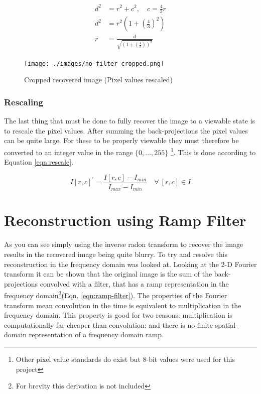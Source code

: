 \documentclass[12pt, a4paper]{article}
\begin{document}
	\begin{align}
		d^2 &= r^2 + c^2, \quad c = \frac{4}{3}r \\
		d^2 &= r^2(1 + (\frac{4}{3})^2) \\
		r &= \frac{d}{\sqrt{(1 + (\frac{4}{3}))^2}} 
		\label{eqn:cropping}
	\end{align}
	
	\begin{figure}
		\centering
		\texttt{[image: ./images/no-filter-cropped.png]}
		\caption{Cropped recovered image (Pixel values rescaled)}
		\label{fig:no-filter-cropped}
	\end{figure}
	
	\subsubsection*{Rescaling}
	The last thing that must be done to fully recover the image to a viewable state is to rescale the pixel values. After summing the back-projections the pixel values can be quite large. For these to be properly viewable they must therefore be converted to an integer value in the range $\{0, ..., 255\}$ \footnote{Other pixel value standards do exist but 8-bit values were used for this project}. This is done according to Equation \ref{eqn:rescale}.

	\begin{equation}
		I[r, c]^\prime = \frac{I[r, c] - I_{min}}{I_{max} - I_{min}} \quad \forall \ [r, c] \in I
		\label{eqn:rescale}
	\end{equation}		
	
\section*{Reconstruction using Ramp Filter}
	As you can see simply using the inverse radon transform to recover the image results in the recovered image being quite blurry. To try and resolve this reconstruction in the frequency domain was looked at. Looking at the 2-D Fourier transform it can be shown that the original image is the sum of the back-projections convolved with a filter, that has a ramp representation in the frequency domain\footnote{For brevity this derivation is not included}(Eqn. \ref{eqn:ramp-filter}). The properties of the Fourier transform mean convolution in the time is equivalent to multiplication in the frequency domain. This property is good for two reasons: multiplication is computationally far cheaper than convolution; and there is no finite spatial-domain representation of a frequency domain ramp.
	
\end{document}
